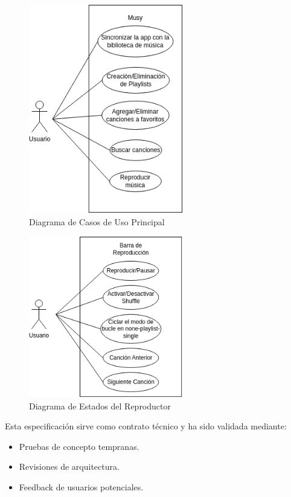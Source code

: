 \documentclass[11pt, a4paper]{article}
\begin{document}
  \begin{figure}[H]
    \centering
    \includegraphics[width=0.6\textwidth]{media/CasoUso1.drawio.png}
    \caption{Diagrama de Casos de Uso Principal}
    \label{fig:usecase}
  \end{figure}

  \begin{figure}[H]
    \centering
    \includegraphics[width=0.6\textwidth]{media/CasoUso2.drawio.png}
    \caption{Diagrama de Estados del Reproductor}
    \label{fig:state}
  \end{figure}

  Esta especificación sirve como contrato técnico y ha sido validada mediante:
  \begin{itemize}
    \item Pruebas de concepto tempranas.
    \item Revisiones de arquitectura.
    \item Feedback de usuarios potenciales.
  \end{itemize}
\end{document}
